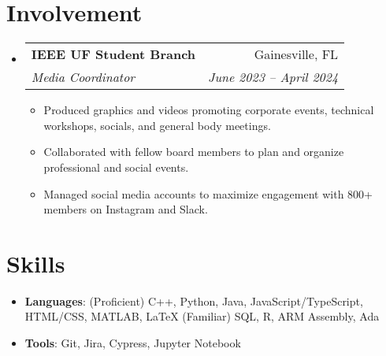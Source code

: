 \documentclass[letterpaper,11pt]{article}
\makeatletter
\newcommand{\resumeItemSkills}[2]{
  \item\normalsize{
    \textbf{#1}{: #2 \vspace{-2pt}}
  }
}
\newcommand{\resumeItemExperience}[1]{
  \item\small{
    {#1 \vspace{-2pt}}
  }
}
\newcommand{\resumeSubheading}[4]{
  \vspace{-1pt}\item
    \begin{tabular*}{0.97\textwidth}{l@{\extracolsep{\fill}}r}
      \textbf{#1} & #2 \\
      \textit{\small#3} & \textit{\small #4} \\
    \end{tabular*}\vspace{-6pt}
}
\newcommand{\resumeSubItemSkills}[2]{\resumeItemSkills{#1}{#2}\vspace{-4pt}}
\newcommand{\resumeSubHeadingListStart}{\begin{itemize}[leftmargin=*, label={}]}
\newcommand{\resumeSubHeadingListStartSkillsAwards}{\begin{itemize}[leftmargin=*]}
\newcommand{\resumeSubHeadingListEnd}{\end{itemize}}
\newcommand{\resumeItemListStart}{\begin{itemize}}
\newcommand{\resumeItemListEnd}{\end{itemize}\vspace{-5pt}}
\makeatother
\begin{document}
\section{Involvement}
    \resumeSubHeadingListStart
      \resumeSubheading
        {IEEE UF Student Branch}{Gainesville, FL}
        {Media Coordinator}{June 2023 -- April 2024}
        \resumeItemListStart
          \resumeItemExperience
            {Produced graphics and videos promoting corporate events, technical workshops, socials, and general body meetings.}
          \resumeItemExperience
            {Collaborated with fellow board members to plan and organize professional and social events.}
          \resumeItemExperience
            {Managed social media accounts to maximize engagement with 800+ members on Instagram and Slack.}
        \resumeItemListEnd
    \resumeSubHeadingListEnd
          
\section{Skills}
  \resumeSubHeadingListStartSkillsAwards
    \resumeSubItemSkills{Languages}{(Proficient) C++, Python, Java, JavaScript/TypeScript, HTML/CSS, MATLAB, LaTeX \newline
    (Familiar) SQL, R, ARM Assembly, Ada}
    \resumeSubItemSkills{Tools}{Git, Jira, Cypress, Jupyter Notebook}
  \resumeSubHeadingListEnd
\end{document}
